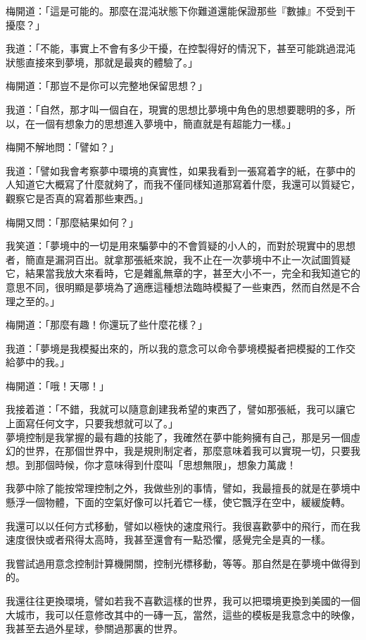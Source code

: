 梅開道：「這是可能的。那麼在混沌狀態下你難道還能保證那些『數據』不受到干擾麼？」

我道：「不能，事實上不會有多少干擾，在控製得好的情況下，甚至可能跳過混沌狀態直接來到夢境，那就是最爽的體驗了。」

梅開道：「那豈不是你可以完整地保留思想？」

我道：「自然，那才叫一個自在，現實的思想比夢境中角色的思想要聰明的多，所以，在一個有想象力的思想進入夢境中，簡直就是有超能力一樣。」

梅開不解地問：「譬如？」

我道：「譬如我會考察夢中環境的真實性，如果我看到一張寫着字的紙，在夢中的人知道它大概寫了什麼就夠了，而我不僅同樣知道那寫着什麼，我還可以質疑它，觀察它是否真的寫着那些東西。」

梅開又問：「那麼結果如何？」

我笑道：「夢境中的一切是用來騙夢中的不會質疑的小人的，而對於現實中的思想者，簡直是漏洞百出。就拿那張紙來說，我不止在一次夢境中不止一次試圖質疑它，結果當我放大來看時，它是雜亂無章的字，甚至大小不一，完全和我知道它的意思不同，很明顯是夢境為了適應這種想法臨時模擬了一些東西，然而自然是不合理之至的。」

梅開道：「那麼有趣！你還玩了些什麼花樣？」

我道：「夢境是我模擬出來的，所以我的意念可以命令夢境模擬者把模擬的工作交給夢中的我。」

梅開道：「哦！天哪！」

我接着道：「不錯，我就可以隨意創建我希望的東西了，譬如那張紙，我可以讓它上面寫任何文字，只要我想就可以了。」
\\


夢境控制是我掌握的最有趣的技能了，我確然在夢中能夠擁有自己，那是另一個虛幻的世界，在那個世界中，我是規則制定者，那麼意味着我可以實現一切，只要我想。到那個時候，你才意味得到什麼叫「思想無限」，想象力萬歲！

我夢中除了能按常理控制之外，我做些別的事情，譬如，我最擅長的就是在夢境中懸浮一個物體，下面的空氣好像可以托着它一樣，使它飄浮在空中，緩緩旋轉。

我還可以以任何方式移動，譬如以極快的速度飛行。我很喜歡夢中的飛行，而在我速度很快或者飛得太高時，我甚至還會有一點恐懼，感覺完全是真的一樣。

我嘗試過用意念控制計算機開關，控制光標移動，等等。那自然是在夢境中做得到的。

我還往往更換環境，譬如若我不喜歡這樣的世界，我可以把環境更換到美國的一個大城市，我可以任意修改其中的一磚一瓦，當然，這些的模板是我意念中的映像，我甚至去過外星球，參關過那裏的世界。

